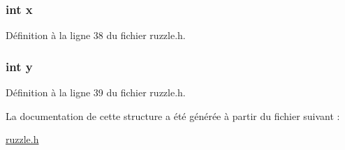 \subsubsection[{x}]{\setlength{\rightskip}{0pt plus 5cm}int x}\label{structcoord_a6150e0515f7202e2fb518f7206ed97dc}


Définition à la ligne 38 du fichier ruzzle.\+h.

\hypertarget{structcoord_a0a2f84ed7838f07779ae24c5a9086d33}{}
\subsubsection[{y}]{\setlength{\rightskip}{0pt plus 5cm}int y}\label{structcoord_a0a2f84ed7838f07779ae24c5a9086d33}


Définition à la ligne 39 du fichier ruzzle.\+h.



La documentation de cette structure a été générée à partir du fichier suivant \+:\begin{DoxyCompactItemize}
\item 
\hyperlink{ruzzle_8h}{ruzzle.\+h}\end{DoxyCompactItemize}
